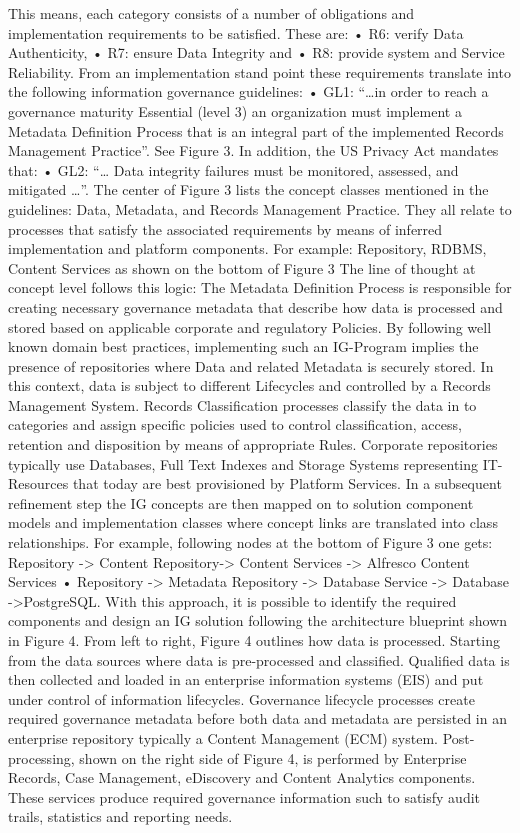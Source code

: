 \documentclass[a4paper,twoside]{article}
\begin{document}
%
 This means, each category consists of a number of obligations and implementation requirements to be satisfied. These are: 
•	R6: verify Data Authenticity, 
•	R7: ensure Data Integrity and 
•	R8: provide system and Service Reliability. 
From an implementation stand point these requirements translate into the following information governance guidelines:
 •	GL1: “…in order to reach a governance maturity Essential (level 3) an organization must implement a Metadata Definition Process that is an integral part of the implemented Records Management Practice”. See Figure 3.
 In addition, the US Privacy Act mandates that:
 •	GL2: “… Data integrity failures must be monitored, assessed, and mitigated …”.  
The center of Figure 3 lists the concept classes mentioned in the guidelines: Data, Metadata, and Records Management Practice. They all relate to processes that satisfy the associated requirements by means of inferred implementation and platform components. For example: Repository, RDBMS, Content Services as shown on the bottom of  Figure 3 
%
The line of thought at concept level follows this logic: The Metadata Definition Process is responsible for creating necessary governance metadata that describe how data is processed and stored based on applicable corporate and regulatory Policies. 
By following well known domain best practices, implementing such an IG-Program implies the presence of repositories where Data and related Metadata is securely stored. In this context, data is subject to different Lifecycles and controlled by a Records Management System. 
Records Classification processes classify the data in to categories and assign specific policies used to control classification, access, retention and disposition by means of appropriate Rules. 
Corporate repositories typically use Databases, Full Text Indexes and Storage Systems representing IT-Resources that today are best provisioned by Platform Services. 
 In a subsequent refinement step the IG concepts are then mapped on to solution component models and implementation classes where concept links are translated into class relationships. For example, following nodes at the bottom of Figure 3 one gets: 
Repository -> Content Repository-> Content Services -> Alfresco Content Services  •	Repository -> Metadata Repository -> Database Service -> Database ->PostgreSQL. 
With this approach, it is possible to identify the required components and design an IG solution following the architecture blueprint shown in Figure 4. From left to right, Figure 4 outlines how data is processed. Starting from the data sources where data is pre-processed and classified. Qualified data is then collected and loaded in an enterprise information systems (EIS) and put under control of information lifecycles. Governance lifecycle processes create required governance metadata before both data and metadata are persisted in an enterprise repository typically a Content Management (ECM) system. Post-processing, shown on the right side of Figure 4, is performed by Enterprise Records, Case Management, eDiscovery and Content Analytics components.  These services produce required governance information such to satisfy audit trails, statistics and reporting needs. 
\end{document}
